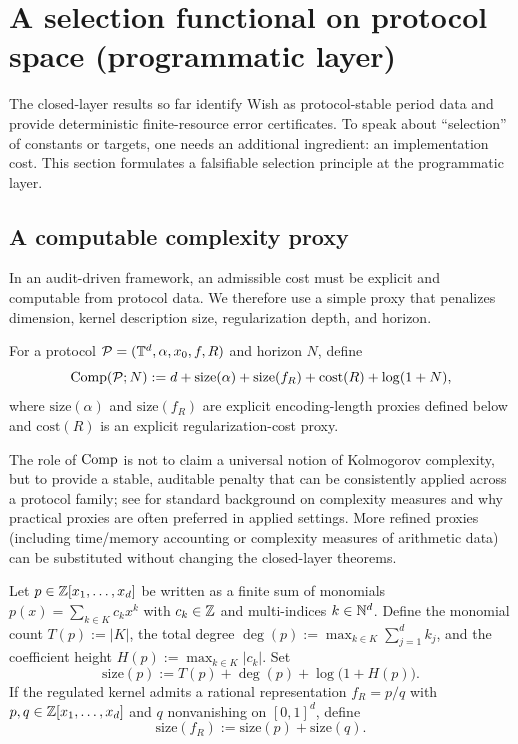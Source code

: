 
\section{A selection functional on protocol space (programmatic layer)}
\label{sec:selection_principle}

The closed-layer results so far identify Wish as protocol-stable period data and provide deterministic finite-resource error certificates.
To speak about ``selection'' of constants or targets, one needs an additional ingredient: an implementation cost.
This section formulates a falsifiable selection principle at the programmatic layer.

\subsection{A computable complexity proxy}
\label{sec:complexity_proxy}

In an audit-driven framework, an admissible cost must be explicit and computable from protocol data.
We therefore use a simple proxy that penalizes dimension, kernel description size, regularization depth, and horizon.

\begin{definition}
\label{def:comp}
For a protocol $\mathcal{P}=(\mathbb{T}^d,\alpha,x_0,f,R)$ and horizon $N$, define
\[
\mathrm{Comp}(\mathcal{P};N)
:=
d+\mathrm{size}(\alpha)+\mathrm{size}(f_R)+\mathrm{cost}(R)+\log(1+N),
\]
where $\mathrm{size}(\alpha)$ and $\mathrm{size}(f_R)$ are explicit encoding-length proxies defined below and $\mathrm{cost}(R)$ is an explicit regularization-cost proxy.
\end{definition}

\begin{remark}
The role of $\mathrm{Comp}$ is not to claim a universal notion of Kolmogorov complexity, but to provide a stable, auditable penalty that can be consistently applied across a protocol family; see \cite{LiVitanyi2008} for standard background on complexity measures and why practical proxies are often preferred in applied settings.
More refined proxies (including time/memory accounting or complexity measures of arithmetic data) can be substituted without changing the closed-layer theorems.
\end{remark}

\begin{definition}
\label{def:kernel_size_proxy}
Let $p\in\mathbb{Z}[x_1,\dots,x_d]$ be written as a finite sum of monomials $p(x)=\sum_{k\in K} c_k x^k$ with $c_k\in\mathbb{Z}$ and multi-indices $k\in\mathbb{N}^d$.
Define the monomial count $T(p):=|K|$, the total degree $\deg(p):=\max_{k\in K}\sum_{j=1}^d k_j$, and the coefficient height $H(p):=\max_{k\in K}|c_k|$.
Set
\[
\mathrm{size}(p):=T(p)+\deg(p)+\log\big(1+H(p)\big).
\]
If the regulated kernel admits a rational representation $f_R=p/q$ with $p,q\in\mathbb{Z}[x_1,\dots,x_d]$ and $q$ nonvanishing on $[0,1]^d$, define
\[
\mathrm{size}(f_R):=\mathrm{size}(p)+\mathrm{size}(q).
\]
\end{definition}

